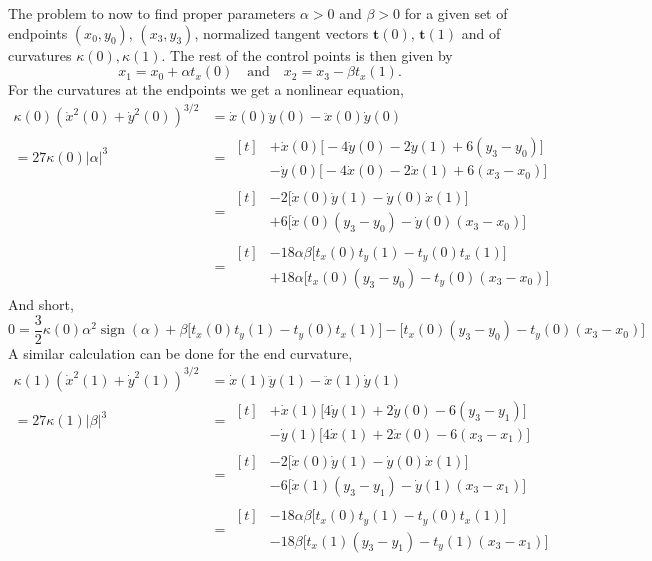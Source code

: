 \documentclass{article}
\newcommand{\sign}{\operatorname{sign}}
\begin{document}
The problem to now to find proper parameters $\alpha>0$ and $\beta>0$ for a given set of
endpoints $(x_0,y_0)$, $(x_3, y_3)$,
normalized tangent vectors $\mathbf{t}(0)$, $\mathbf{t}(1)$ and of
curvatures $\kappa(0), \kappa(1)$.
The rest of the control points is then given by
%
\begin{equation}
  x_1 = x_0 + \alpha t_x(0) \quad\text{and}\quad
  x_2 = x_3 - \beta  t_x(1).
\end{equation}
%
For the curvatures at the endpoints we get a nonlinear equation,
%
\begin{align}
  \kappa(0) (\dot x^2(0) + \dot y^2(0))^{3/2}
  &= \dot x(0) \ddot y(0) - \ddot x(0) \dot y(0) \\
  = 27 \kappa(0) |\alpha|^3
  &= \begin{aligned}[t]
      &+\dot x(0) \bigl[- 4\dot y(0) - 2\dot y(1) + 6(y_3-y_0)\bigr] \\
      &-\dot y(0) \bigl[- 4\dot x(0) - 2\dot x(1) + 6(x_3-x_0)\bigr]
     \end{aligned}\\
  &= \begin{aligned}[t]
      &-2 \bigl[\dot x(0) \dot y(1) - \dot y(0)\dot x(1)\bigr] \\
      &+6 \bigl[\dot x(0) (y_3-y_0) - \dot y(0) (x_3-x_0)\bigr]
     \end{aligned}\\
  &= \begin{aligned}[t]
      &-18 \alpha\beta \bigl[t_x(0)t_y(1) - t_y(0)t_x(1)\bigr] \\
      &+18 \alpha \bigl[t_x(0) (y_3-y_0) - t_y(0) (x_3-x_0)\bigr]
     \end{aligned}
\end{align}
%
And short,
%
\begin{equation}
  0 = \frac{3}{2}\kappa(0) \alpha^2 \sign(\alpha)
    + \beta \bigl[t_x(0)t_y(1) - t_y(0)t_x(1)\bigr]
    - \bigl[t_x(0) (y_3-y_0) - t_y(0) (x_3-x_0)\bigr]
\end{equation}
%
A similar calculation can be done for the end curvature,
%
\begin{align}
  \kappa(1) (\dot x^2(1) + \dot y^2(1))^{3/2}
  &= \dot x(1) \ddot y(1) - \ddot x(1) \dot y(1) \\
  = 27 \kappa(1) |\beta|^3
  &= \begin{aligned}[t]
       &+\dot x(1) \bigl[ 4\dot y(1) + 2\dot y(0) - 6(y_3-y_1)\bigr] \\
       &-\dot y(1) \bigl[ 4\dot x(1) + 2\dot x(0) - 6(x_3-x_1)\bigr]
     \end{aligned}\\
  &= \begin{aligned}[t]
       &-2 \bigl[\dot x(0) \dot y(1) - \dot y(0)\dot x(1)\bigr] \\
       &-6 \bigl[\dot x(1) (y_3-y_1) - \dot y(1) (x_3-x_1)\bigr]
     \end{aligned}\\
  &= \begin{aligned}[t]
       &-18 \alpha\beta \bigl[t_x(0)t_y(1) - t_y(0)t_x(1)\bigr] \\
       &-18 \beta \bigl[t_x(1) (y_3-y_1) - t_y(1) (x_3-x_1)\bigr]
     \end{aligned}
\end{align}
\end{document}
